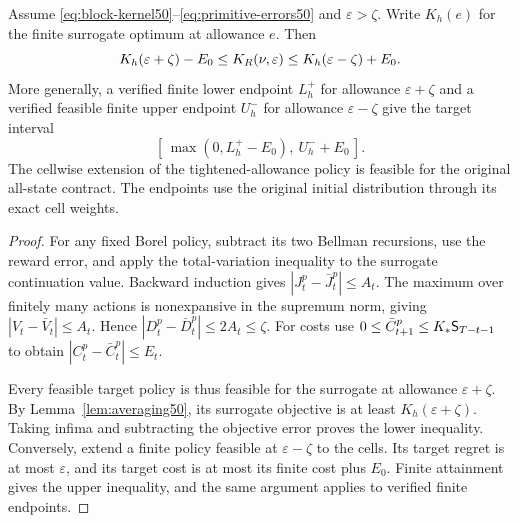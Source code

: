\begin{theorem}\label{thm:density-pair50}
Assume \eqref{eq:block-kernel50}--\eqref{eq:primitive-errors50} and $\varepsilon>\zeta$. Write $K_h(e)$ for the finite surrogate optimum at allowance $e$. Then
\begin{equation}\label{eq:density-bracket50}
 K_h(\varepsilon+\zeta)-E_0
 \le K_R(\nu,\varepsilon)
 \le K_h(\varepsilon-\zeta)+E_0.
\end{equation}
More generally, a verified finite lower endpoint $L_h^+$ for allowance $\varepsilon+\zeta$ and a verified feasible finite upper endpoint $U_h^-$ for allowance $\varepsilon-\zeta$ give the target interval
\begin{equation}\label{eq:density-computable50}
 [\,\max(0,L_h^+-E_0),\ U_h^-+E_0\,].
\end{equation}
The cellwise extension of the tightened-allowance policy is feasible for the original all-state contract. The endpoints use the original initial distribution through its exact cell weights.
\end{theorem}
\begin{proof}
For any fixed Borel policy, subtract its two Bellman recursions, use the reward error, and apply the total-variation inequality to the surrogate continuation value. Backward induction gives $|J_t^p-\bar J_t^p|\le A_t$. The maximum over finitely many actions is nonexpansive in the supremum norm, giving $|V_t-\bar V_t|\le A_t$. Hence $|D_t^p-\bar D_t^p|\le2A_t\le\zeta$. For costs use $0\le\bar C_{t+1}^p\le K_*\mathsf S_{T-t-1}$ to obtain $|C_t^p-\bar C_t^p|\le E_t$.

Every feasible target policy is thus feasible for the surrogate at allowance $\varepsilon+\zeta$. By Lemma~\ref{lem:averaging50}, its surrogate objective is at least $K_h(\varepsilon+\zeta)$. Taking infima and subtracting the objective error proves the lower inequality. Conversely, extend a finite policy feasible at $\varepsilon-\zeta$ to the cells. Its target regret is at most $\varepsilon$, and its target cost is at most its finite cost plus $E_0$. Finite attainment gives the upper inequality, and the same argument applies to verified finite endpoints.\end{proof}

